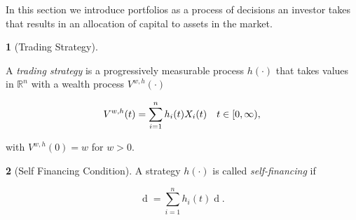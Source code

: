\documentclass[british]{amsart} \usepackage{lmodern}
\numberwithin{equation}{section} \numberwithin{figure}{section}
\theoremstyle{plain} \newtheorem{thm}{\protect\theoremname}[section]
\theoremstyle{definition} \newtheorem{defn}[thm]{\protect\definitionname}
\theoremstyle{plain} \newtheorem{assumption}[thm]{\protect\assumptionname}
\theoremstyle{plain} \newtheorem{lem}[thm]{\protect\lemmaname}
\theoremstyle{plain} \newtheorem{prop}[thm]{\protect\propositionname}
\theoremstyle{remark} \newtheorem{rem}[thm]{\protect\remarkname}
\theoremstyle{plain} \newtheorem{cor}[thm]{\protect\corollaryname}
\renewcommand{\d}[1]{\mathop{\mathrm{d}{#1}}}
\newcommand{\abs}[1]{\mathop{|{#1}|}} \newcommand{\market}{\mathcal{M}}
\begin{document}
In this section we introduce portfolios as a process of decisions an investor
takes that results in an allocation of capital to assets in the market.

\begin{defn} [Trading Strategy]
  \label{def:tradingstrategy}

  A \textit{trading strategy} is a progressively measurable process $h(\cdot)$
  that takes values in $\mathbb{R}^{n}$ with a wealth process $V^{w,h}(\cdot)$ 

  \begin{equation*}
    V^{w,h}(t) = \sum_{i=1}^{n} h_{i}(t) X_{i}(t) 
    \quad t\in[0,\infty),
  \end{equation*}

  with $V^{w,h}(0)=w$ for $w > 0$. 


%

\end{defn}

\begin{defn} [Self Financing Condition]
  \label{def:selffinancingcondition}  
  A strategy $h(\cdot)$ is called \textit{self-financing} if 

  \begin{equation}
    \d{V^{w,h}(t)} = \sum_{i=1}^{n} h_{i}(t) \d{X_{i}(t)}.
  \end{equation}


\end{defn}
\end{document}
